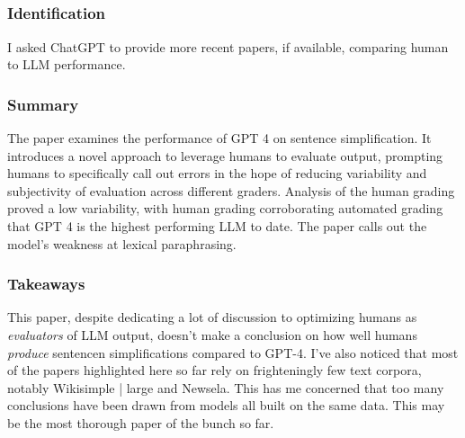 \documentclass[
	letterpaper, %
]{jdf}
\begin{document}
\subsection{}
\subsubsection{Identification}
I asked ChatGPT to provide more recent papers, if available, comparing human to LLM performance.

\subsubsection{Summary}
The paper examines the performance of GPT 4 on sentence simplification. It introduces a novel approach to leverage humans to evaluate output, prompting humans to specifically call out errors in the hope of reducing variability and subjectivity of evaluation across different graders. Analysis of the human grading proved a low variability, with human grading corroborating automated grading that GPT 4 is the highest performing LLM to date. The paper calls out the model's weakness at lexical paraphrasing.

\subsubsection{Takeaways}
This paper, despite dedicating a lot of discussion to optimizing humans as \textit{evaluators} of LLM output, doesn't make a conclusion on how well humans \textit{produce} sentencen simplifications compared to GPT-4. I've also noticed that most of the papers highlighted here so far rely on frighteningly few text corpora, notably Wiki{simple | large} and Newsela. This has me concerned that too many conclusions have been drawn from models all built on the same data. This may be the most thorough paper of the bunch so far.

\subsection{}
\end{document}
